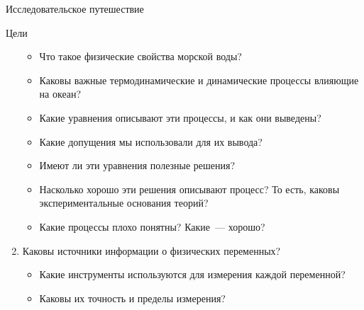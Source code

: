 \begin{chapter}{Исследовательское путешествие}
\begin{section}{Цели}
\begin{enumerate}
\begin{itemize}
  \item
  Что такое физические свойства морской воды? 
%

  \item
  Каковы важные термодинамические и динамические процессы влияющие на океан? 
%

  \item
  Какие уравнения описывают эти процессы, и как они выведены? 
%

  \item
  Какие допущения мы использовали для их вывода? 
%

  \item
  Имеют ли эти уравнения полезные решения? 
%

  \item
  Насколько хорошо эти решения описывают процесс? То есть, каковы 
  экспериментальные основания теорий? 
%

  \item
  Какие процессы плохо понятны? Какие~--- хорошо?
%
\end{itemize}

\item
Каковы источники информации о физических переменных?
%

\begin{itemize}
  \item
  Какие инструменты используются для измерения каждой переменной? 
%

  \item
  Каковы их точность и пределы измерения? 
%


\end{itemize}
\end{enumerate}
\end{section}
\end{chapter}

